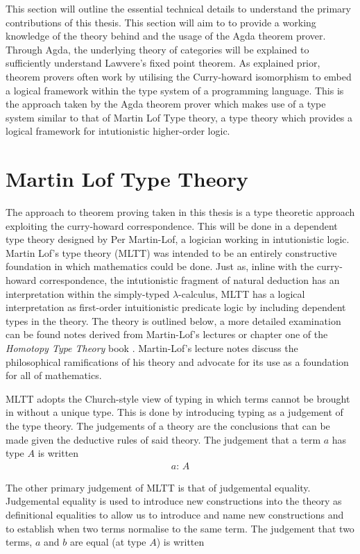 This section will outline the essential technical details to understand the
primary contributions of this thesis. This section will aim to to provide a
working knowledge of the theory behind and the usage of the Agda theorem prover.
Through Agda, the underlying theory of categories will be explained to
sufficiently understand Lawvere's fixed point theorem. As explained prior,
theorem provers often work by utilising the Curry-howard isomorphism to embed a
logical framework within the type system of a programming language. This is the
approach taken by the Agda theorem prover which makes use of a type system
similar to that of Martin Lof Type theory, a type theory which provides a
logical framework for intutionistic higher-order logic.

\section{Martin Lof Type Theory}
The approach to theorem proving taken in this thesis is a type theoretic
approach exploiting the curry-howard correspondence. This will be done in a
dependent type theory designed by Per Martin-Lof, a logician working in
intutionistic logic. Martin Lof's type theory (MLTT) was intended to be an
entirely constructive foundation in which mathematics could be done. Just as,
inline with the curry-howard correspondence, the intutionistic fragment of
natural deduction has an interpretation within the simply-typed
$\lambda$-calculus, MLTT has a logical interpretation as first-order
intuitionistic predicate logic by including dependent types in the theory. The
theory is outlined below, a more detailed examination can be found notes derived
from Martin-Lof's lectures \cite{martin1984intuitionistic} or chapter one of the
\textit{Homotopy Type Theory} book \cite{hottbook}. Martin-Lof's lecture notes
discuss the philosophical ramifications of his theory and advocate for its use
as a foundation for all of mathematics.

MLTT adopts the Church-style view of typing in which terms cannot be brought in
without a unique type. This is done by introducing typing as a judgement of the
type theory. The judgements of a theory are the conclusions that can be made
given the deductive rules of said theory. The judgement that a term $a$ has type
$A$ is written
\begin{align*}
    a: \, A
\end{align*}

The other primary judgement of MLTT is that of judgemental equality. Judgemental
equality is used to introduce new constructions into the theory as definitional
equalities to allow us to introduce and name new constructions and to establish
when two terms normalise to the same term. The judgement that two terms,
$a$ and $b$ are equal (at type $A$) is written

